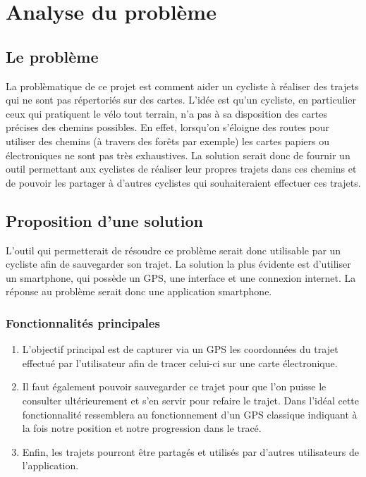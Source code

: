 \documentclass{article}
\begin{document}

\newpage
\section{Analyse du problème}
\subsection{Le problème}
La problèmatique de ce projet est comment aider un cycliste à réaliser des trajets qui ne sont pas répertoriés sur des cartes. L'idée est qu'un cycliste, 
en particulier ceux qui pratiquent le vélo tout terrain, n'a pas à sa disposition des cartes précises des chemins possibles. En effet,
lorsqu'on s'éloigne des routes pour utiliser des chemins (à travers des forêts par exemple) les cartes papiers ou électroniques ne sont pas
très exhaustives. La solution serait donc de fournir un outil permettant aux cyclistes de réaliser leur propres trajets dans ces
chemins et de pouvoir les partager à d'autres cyclistes qui souhaiteraient effectuer ces trajets.

\subsection{Proposition d'une solution}
L'outil qui permetterait de résoudre ce problème serait donc utilisable par un cycliste afin de sauvegarder son trajet. La solution la plus évidente
est d'utiliser un smartphone, qui possède un GPS, une interface et une connexion internet. La réponse au problème serait donc une application
smartphone.

\subsubsection{Fonctionnalités principales}
\begin{enumerate}
  \item L'objectif principal est de capturer via un GPS les coordonnées du trajet effectué par l'utilisateur afin de tracer celui-ci sur une carte
  électronique.
  \item Il faut également pouvoir sauvegarder ce trajet pour que l'on puisse le consulter ultérieurement et s'en servir pour refaire le trajet.
  Dans l'idéal cette fonctionnalité ressemblera au fonctionnement d'un GPS classique indiquant à la fois notre position et notre progression dans le tracé.
  \item Enfin, les trajets pourront être partagés et utilisés par d'autres utilisateurs de l'application.
\end{enumerate}
\end{document}
